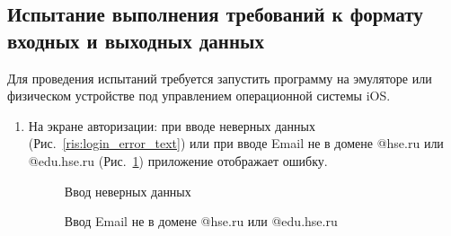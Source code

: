 \documentclass{../includes/TechDoc}
\begin{document}
    \subsection{Испытание выполнения требований к формату входных и выходных данных}

    Для проведения испытаний требуется запустить программу на эмуляторе или физическом устройстве под управлением операционной системы iOS\@.

    \begin{enumerate}
        \item На экране авторизации: при вводе неверных данных (Рис.~\ref{ris:login_error_text}) или при вводе Email не в домене @hse.ru или @edu.hse.ru (Рис.~\ref{ris:login_error_email}) приложение отображает ошибку.
        \begin{figure}[ht]
            \begin{center}
                \begin{minipage}[ht]{0.49\linewidth}
                    \caption{Ввод неверных данных} %
                    \label{ris:login_error_text} %
                \end{minipage}
                \hfill
                \begin{minipage}[ht]{0.49\linewidth}
                    \caption{Ввод Email не в домене @hse.ru или @edu.hse.ru}
                    \label{ris:login_error_email}
                \end{minipage}
            \end{center}
        \end{figure}


\end{enumerate}
\end{document}
